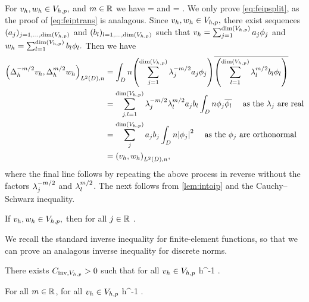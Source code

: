 \label{lem:intoip}
For $v_{h}, w_{h} \in V_{h,p},$ and $m \in \mathbb R$ we have
\beq\label{eq:feipsplit}
\IPLtDn{\vh}{\wh} = \IPLtDn{\Deltahmmt \vh}{\Deltahmt \wh} 
\eeq
and
\beq\label{eq:feiptrans}
 = \IPLtDn{\Deltahmt \vh}{\Deltahmt \vh}.
\eeq
\ele
{}
We only prove \cref{eq:feipsplit}, as the proof of \cref{eq:feiptrans} is analagous. Since $v_{h},w_{h} \in V_{h,p},$ there exist sequences $(\aj)_{j =1,\ldots,\dimVhp}$ and $(\bsl)_{l =1,\ldots,\dimVhp}$ such that $\vh = \sum_{j=1}^{\dimVhp} \aj\phij$ and $\wh = \sum_{l=1}^{\dimVhp} \bsl \phil.$ Then we have
\begin{align*}
\IPLtDn{\Deltahmmt \vh}{\Deltahmt \wh} &= \int_D n\mleft(\sum_{j=1}^{\dimVhp}\lambdaj^{-m/2} \aj\phij\mright)\overline{\mleft(\sum_{l=1}^{\dimVhp} \lambdal^{m/2}\bsl \phil\mright)}\\
&= \sum_{j,l=1}^{\dimVhp} \lambdaj^{-m/2} \lambdal^{m/2} \aj \bsl \int_D n \phij \philbar\quad \text{ as the } \lambdaj \text{ are real}\\
& =\sum_{j}^{\dimVhp} \aj \bsj \int_D n\abs{\phij}^2\quad \text{ as the } \phij \text{ are orthonormal}\\
&= \IPLtDn{\vh}{\wh},
\end{align*}
where the final line follows by repeating the above process in reverse without the factors $\lambda_{j}^{-m/2}$ and $\lambda_{l}^{m/2}$.
\epf
The next  follows from \cref{lem:intoip} and the Cauchy--Schwarz inequality.

\label{cor:ipdiscbound}
If $v_{h}, w_{h} \in V_{h,p},$ then for all $j \in \mathbb R$
\beqs
\IPLtDn{\vh}{\wh} \leq \Njh{\vh}\Nmjh{\wh}.
\eeqs
\eco

We recall the standard inverse inequality for finite-element functions, so that we can prove an analagous inverse inequality for discrete norms.

\label{lem:inverseinequality}
There exists $C_{\mathrm{inv},V_{h,p}} > 0$ such that for all $v_{h} \in V_{h,p}$
\beqs
\NHoD{\vh} \leq \CinvVhp h^{-1} \NLtD{\vh}.
\eeqs
\ele



\label{lem:inversediscrete}
For all $m \in \mathbb R$, for all $v_{h} \in V_{h,p}$
\beqs
\Nmhn{\vh} \leq \Chinv {} h^{-1} \Nmmohn{\vh}.
\eeqs
\ele

